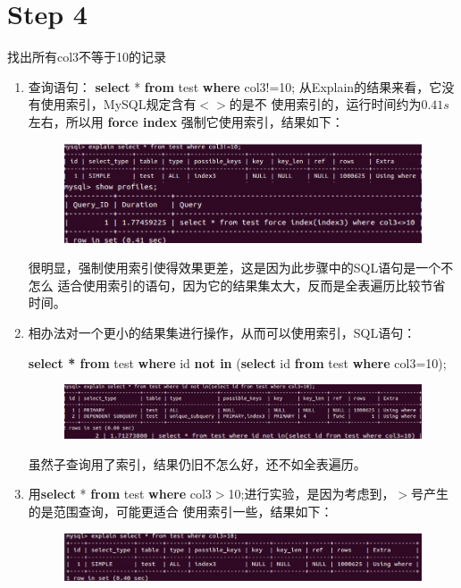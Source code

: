 \documentclass[UTF8]{ctexart}
\begin{document}
\section{Step 4}
找出所有col3不等于10的记录
    \begin{enumerate}
        \item 查询语句：
        \textbf{select }* \textbf{from }test \textbf{where }col3!=10;
        从Explain的结果来看，它没有使用索引，MySQL规定含有$<>$的是不
        使用索引的，运行时间约为$0.41s$左右，所以用
        \textbf{force index }强制它使用索引，结果如下：
        \begin{figure}[ht]
            \centering
            \includegraphics[scale=0.55]{db8.jpg}
            \label{fig:db8}
        \end{figure} 
        
        很明显，强制使用索引使得效果更差，这是因为此步骤中的SQL语句是一个不怎么
        适合使用索引的语句，因为它的结果集太大，反而是全表遍历比较节省时间。
        
        \item 相办法对一个更小的结果集进行操作，从而可以使用索引，SQL语句：
        
        \textbf{select * from }test \textbf{where }id \textbf{not in} 
        (\textbf{select } id \textbf{from }test \textbf{where} col3=10);
        \begin{figure}[ht]
            \centering
            \includegraphics[scale=0.55]{db9.jpg}
            \label{fig:db9}
        \end{figure} 
        
        虽然子查询用了索引，结果仍旧不怎么好，还不如全表遍历。
        \item 用\textbf{select }* \textbf{from }test \textbf{where }col3$>$10;进行实验，是因为考虑到，$>$号产生的是范围查询，可能更适合
            使用索引一些，结果如下：
        \begin{figure}[ht]
            \centering
            \includegraphics[scale=0.55]{db10.jpg}
            \label{fig:db10}
        \end{figure} 
        

\end{enumerate}
\end{document}
